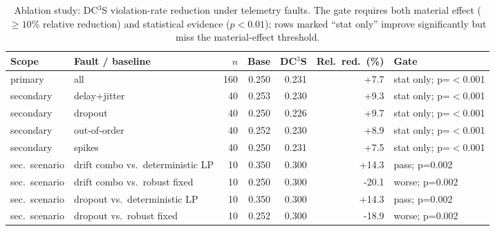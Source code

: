 \begin{table}[htbp]
\centering
\footnotesize
\caption{Ablation study: DC$^3$S violation-rate reduction under telemetry faults. The gate requires both material effect ($\ge10$\% relative reduction) and statistical evidence ($p<0.01$); rows marked ``stat only'' improve significantly but miss the material-effect threshold.}
\label{tab:TBL02_ABLATIONS}
\setlength{\tabcolsep}{4pt}
\renewcommand{\arraystretch}{1.05}
\begin{tabularx}{\textwidth}{llrrrrX}
\toprule
Scope & Fault / baseline & $n$ & Base & DC$^3$S & Rel.\ red.\ (\%) & Gate \\
\midrule
primary & all & 160 & 0.250 & 0.231 & +7.7 & stat only; p=$<$0.001 \\
\midrule
secondary & delay+jitter & 40 & 0.253 & 0.230 & +9.3 & stat only; p=$<$0.001 \\
secondary & dropout & 40 & 0.250 & 0.226 & +9.7 & stat only; p=$<$0.001 \\
secondary & out-of-order & 40 & 0.252 & 0.230 & +8.9 & stat only; p=$<$0.001 \\
secondary & spikes & 40 & 0.250 & 0.231 & +7.5 & stat only; p=$<$0.001 \\
\midrule
sec.\ scenario & drift combo vs.\ deterministic LP & 10 & 0.350 & 0.300 & +14.3 & pass; p=0.002 \\
sec.\ scenario & drift combo vs.\ robust fixed & 10 & 0.250 & 0.300 & -20.1 & worse; p=0.002 \\
sec.\ scenario & dropout vs.\ deterministic LP & 10 & 0.350 & 0.300 & +14.3 & pass; p=0.002 \\
sec.\ scenario & dropout vs.\ robust fixed & 10 & 0.252 & 0.300 & -18.9 & worse; p=0.002 \\
\bottomrule
\end{tabularx}
\end{table}